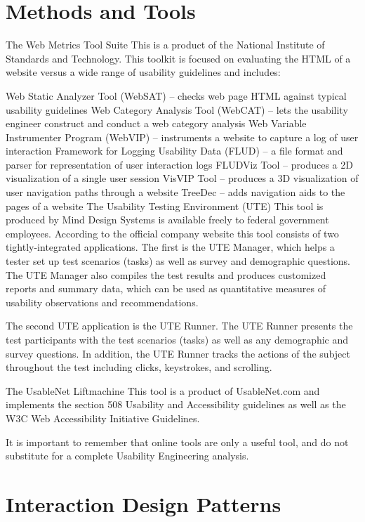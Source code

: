 \documentclass[letterpaper,12pt]{article}
\begin{document}
\section{Methods and Tools}

The Web Metrics Tool Suite
This is a product of the National Institute of Standards and Technology. This toolkit is focused on evaluating the HTML of a website versus a wide range of usability guidelines and includes:

Web Static Analyzer Tool (WebSAT) – checks web page HTML against typical usability guidelines
Web Category Analysis Tool (WebCAT) – lets the usability engineer construct and conduct a web category analysis
Web Variable Instrumenter Program (WebVIP) – instruments a website to capture a log of user interaction
Framework for Logging Usability Data (FLUD) – a file format and parser for representation of user interaction logs
FLUDViz Tool – produces a 2D visualization of a single user session
VisVIP Tool – produces a 3D visualization of user navigation paths through a website
TreeDec – adds navigation aids to the pages of a website
The Usability Testing Environment (UTE)
This tool is produced by Mind Design Systems is available freely to federal government employees. According to the official company website this tool consists of two tightly-integrated applications. The first is the UTE Manager, which helps a tester set up test scenarios (tasks) as well as survey and demographic questions. The UTE Manager also compiles the test results and produces customized reports and summary data, which can be used as quantitative measures of usability observations and recommendations.

The second UTE application is the UTE Runner. The UTE Runner presents the test participants with the test scenarios (tasks) as well as any demographic and survey questions. In addition, the UTE Runner tracks the actions of the subject throughout the test including clicks, keystrokes, and scrolling.

The UsableNet Liftmachine
This tool is a product of UsableNet.com and implements the section 508 Usability and Accessibility guidelines as well as the W3C Web Accessibility Initiative Guidelines.

It is important to remember that online tools are only a useful tool, and do not substitute for a complete Usability Engineering analysis.


\section{Interaction Design Patterns}
\end{document}
